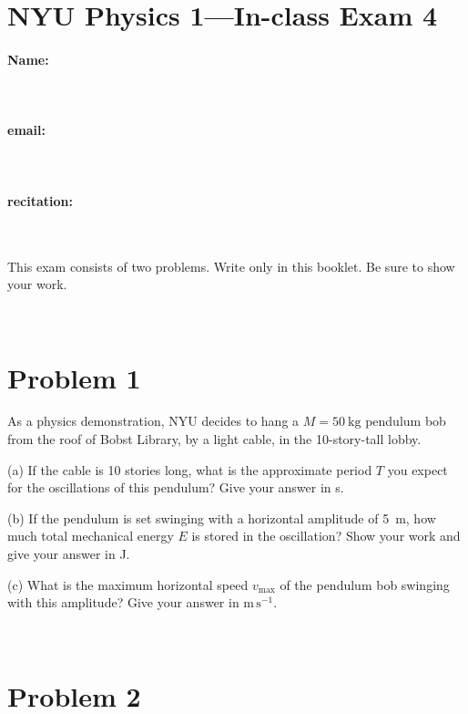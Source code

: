 \documentclass[12pt]{article}
\begin{document}
\section*{NYU Physics 1---In-class Exam 4}

\vfill

\paragraph{Name:} ~

\paragraph{email:} ~

\paragraph{recitation:} ~

\vfill

This exam consists of two problems.  Write only in this booklet.  Be
sure to show your work.

\vfill ~

\clearpage

\section*{Problem 1}

As a physics demonstration, NYU decides to hang a $M=50~\mathrm{kg}$
pendulum bob from the roof of Bobst Library, by a light cable, in the
10-story-tall lobby.

(a) If the cable is 10 stories long, what is the approximate period
$T$ you expect for the oscillations of this pendulum?  Give your answer
in s.

\vfill

(b) If the pendulum is set swinging with a horizontal amplitude of
5~m, how much total mechanical energy $E$ is stored in the
oscillation?  Show your work and give your answer in J.

\vfill

(c) What is the maximum horizontal speed $v_\mathrm{max}$ of the
pendulum bob swinging with this amplitude?  Give your answer in
$\mathrm{m\,s^{-1}}$.

\vfill ~

\clearpage

\section*{Problem 2}
\end{document}
